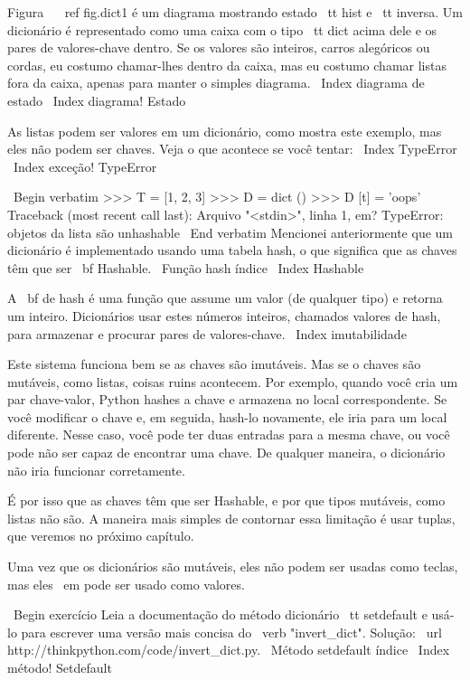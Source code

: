 \documentclass[10pt]{book}
\begin{document}
{{{{{{{Figura ~ \ ref {} fig.dict1 é um diagrama mostrando estado {\ tt hist} e {\ tt inversa}.
Um dicionário é representado como uma caixa com o tipo {\ tt dict} acima dele
e os pares de valores-chave dentro. Se os valores são inteiros, carros alegóricos ou
cordas, eu costumo chamar-lhes dentro da caixa, mas eu costumo chamar listas
fora da caixa, apenas para manter o simples diagrama.
\ Index {diagrama de estado}
\ Index {diagrama! Estado}

As listas podem ser valores em um dicionário, como mostra este exemplo, mas eles
não podem ser chaves. Veja o que acontece se você tentar:
\ Index {} TypeError
\ Index {exceção! TypeError}


\ Begin {verbatim}
>>> T = [1, 2, 3]
>>> D = dict ()
>>> D [t] = 'oops'
Traceback (most recent call last):
  Arquivo "<stdin>", linha 1, em?
TypeError: objetos da lista são unhashable
\ End {verbatim}
%
Mencionei anteriormente que um dicionário é implementado usando
uma tabela hash, o que significa que as chaves têm que ser {\ bf Hashable}.
\ {Função hash} índice
\ Index {} Hashable

A {\ bf de hash} é uma função que assume um valor (de qualquer tipo)
e retorna um inteiro. Dicionários usar estes números inteiros,
chamados valores de hash, para armazenar e procurar pares de valores-chave.
\ Index {imutabilidade}

Este sistema funciona bem se as chaves são imutáveis. Mas se o
chaves são mutáveis, como listas, coisas ruins acontecem. Por exemplo,
quando você cria um par chave-valor, Python hashes a chave e 
armazena no local correspondente. Se você modificar o
chave e, em seguida, hash-lo novamente, ele iria para um local diferente.
Nesse caso, você pode ter duas entradas para a mesma chave,
ou você pode não ser capaz de encontrar uma chave. De qualquer maneira, o
dicionário não iria funcionar corretamente.

É por isso que as chaves têm que ser Hashable, e por que tipos mutáveis, como
listas não são. A maneira mais simples de contornar essa limitação é
usar tuplas, que veremos no próximo capítulo.

Uma vez que os dicionários são mutáveis, eles não podem ser usadas como teclas,
mas eles {\ em} pode ser usado como valores.

\ Begin {} exercício
Leia a documentação do método dicionário {\ tt setdefault}
e usá-lo para escrever uma versão mais concisa do \ verb "invert_dict".
Solução: \ url {http://thinkpython.com/code/invert_dict.py}.
\ {Método setdefault} índice
\ Index {método! Setdefault}

}}}}}}}
\end{document}
